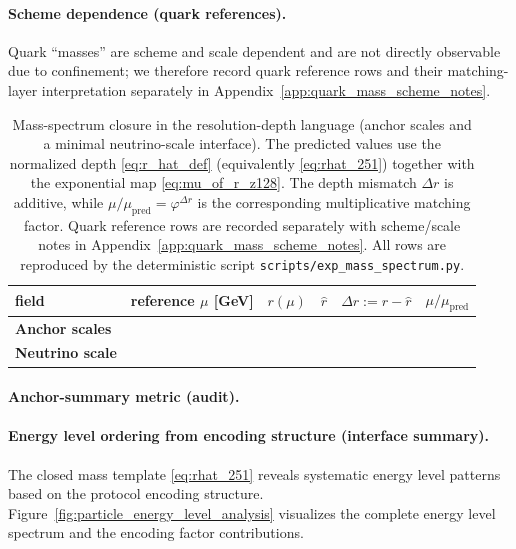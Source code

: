 \paragraph{Scheme dependence (quark references).}
\MatchTag Quark ``masses'' are scheme and scale dependent and are not directly observable due to confinement; we therefore record quark reference rows and their matching-layer interpretation separately in Appendix~\ref{app:quark_mass_scheme_notes}.

\begin{table}[t]
\centering
\small
\setlength{\tabcolsep}{6pt}
\renewcommand{\arraystretch}{1.15}
\begin{tabular}{lrrrrr}
\toprule
field & reference $\mu$ [GeV] & $r(\mu)$ & $\widehat r$ & $\Delta r:=r-\widehat r$ & $\mu/\mu_{\mathrm{pred}}$ \\
\midrule
\textbf{Anchor scales} & & & & & \\

\textbf{Neutrino scale} & & & & & \\

\end{tabular}
\caption{Mass-spectrum closure in the resolution-depth language (anchor scales and a minimal neutrino-scale interface). The predicted values use the normalized depth \eqref{eq:r_hat_def} (equivalently \eqref{eq:rhat_251}) together with the exponential map \eqref{eq:mu_of_r_z128}. The depth mismatch $\Delta r$ is additive, while $\mu/\mu_{\mathrm{pred}}=\varphi^{\Delta r}$ is the corresponding multiplicative matching factor. Quark reference rows are recorded separately with scheme/scale notes in Appendix~\ref{app:quark_mass_scheme_notes}. All rows are reproduced by the deterministic script \texttt{scripts/exp\_mass\_spectrum.py}.}
\label{tab:mass_spectrum}
\end{table}
\paragraph{Anchor-summary metric (audit).}
\AuditTag 

\paragraph{Energy level ordering from encoding structure (interface summary).}
\InterfaceTag The closed mass template \eqref{eq:rhat_251} reveals systematic energy level patterns based on the protocol encoding structure.
Figure~\ref{fig:particle_energy_level_analysis} visualizes the complete energy level spectrum and the encoding factor contributions.


